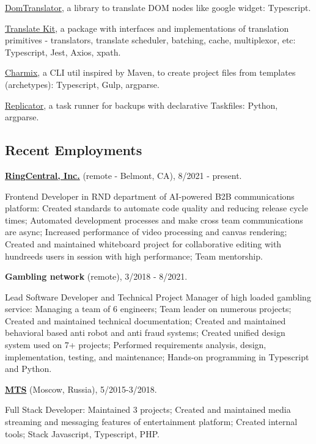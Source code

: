 \documentclass{vitonsky}
\begin{document}
\href{https://github.com/translate-tools/domtranslator}{DomTranslator}, a library to translate DOM nodes like google widget: Typescript.

\href{https://github.com/translate-tools/core}{Translate Kit}, a package with interfaces and implementations of translation primitives - translators, translate scheduler, batching, cache, multiplexor, etc: Typescript, Jest, Axios, xpath.

\href{https://github.com/vitonsky/charmix}{Charmix}, a CLI util inspired
by Maven, to create project files from templates (archetypes):
Typescript, Gulp, argparse.

\href{https://github.com/vitonsky/replicator}{Replicator}, a task runner
for backups with declarative Taskfiles: Python, argparse.

\subsection*{Recent Employments}

\textbf{\href{https://www.ringcentral.com/}{RingCentral, Inc.}} (remote - Belmont, CA), 8/2021 - present.

Frontend Developer in RND department of AI-powered B2B communications platform: Created standards to automate code quality and reducing release cycle times; Automated development processes and make cross team communications are async; Increased performance of video processing and canvas rendering; Created and maintained whiteboard project for collaborative editing with hundreeds users in session with high performance; Team mentorship.

\textbf{Gambling network} (remote), 3/2018 - 8/2021.

Lead Software Developer and Technical Project Manager of high loaded gambling service: Managing a team of 6 engineers; Team leader on numerous projects; Created and maintained technical documentation; Created and maintained behavioral based anti robot and anti fraud systems; Created unified design system used on 7+ projects; Performed requirements analysis, design, implementation, testing, and maintenance; Hands-on programming in Typescript and Python.

\textbf{\href{https://mts.ru}{MTS}} (Moscow, Russia), 5/2015-3/2018.

Full Stack Developer: Maintained 3 projects; Created and maintained media streaming and messaging features of entertainment platform; Created internal tools; Stack Javascript, Typescript, PHP.
\end{document}
